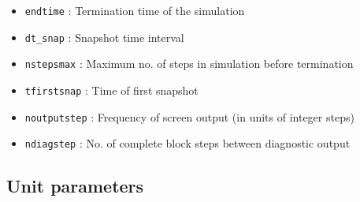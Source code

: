 \documentclass[a4paper]{article}
\newcommand{\var}[1]{\texttt{#1}}
\begin{document}
\begin{itemize}
\item \var{endtime} : Termination time of the simulation

\item \var{dt\_snap} : Snapshot time interval

\item \var{nstepsmax} : Maximum no. of steps in simulation before termination

\item \var{tfirstsnap} : Time of first snapshot

\item \var{noutputstep} : Frequency of screen output (in units of integer steps)

\item \var{ndiagstep} : No. of complete block steps between diagnostic output

\end{itemize}



\subsection{Unit parameters}
\end{document}
